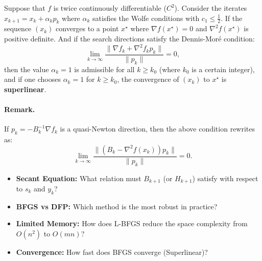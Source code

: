 \begin{theoreme}[Admitted]
    Suppose that $f$ is twice continuously differentiable ($C^2$).
    Consider the iterates $x_{k+1} = x_k + \alpha_k p_k$ where $\alpha_k$ satisfies the Wolfe conditions with $c_1 \le \frac{1}{2}$.
    If the sequence $(x_k)$ converges to a point $x^\star$ where $\nabla f(x^\star) = 0$ and $\nabla^2 f(x^\star)$ is positive definite.
    And if the search directions satisfy the Dennis-Moré condition:
    \begin{equation}
        \lim_{k \to \infty} \frac{\| \nabla f_k + \nabla^2 f_k p_k \|}{\| p_k \|} = 0,
    \end{equation}
    then the value $\alpha_k = 1$ is admissible for all $k \ge k_0$ (where $k_0$ is a certain integer),
    and if one chooses $\alpha_k = 1$ for $k \ge k_0$, the convergence of $(x_k)$ to $x^\star$ is \textbf{superlinear}.
\end{theoreme}

\paragraph{Remark.}
If $p_k = -B_k^{-1} \nabla f_k$ is a quasi-Newton direction, then the above condition rewrites as:
\[
    \lim_{k \to \infty} \frac{\| (B_k - \nabla^2 f(x_k)) p_k \|}{\| p_k \|} = 0.
\]
\bigskip
\begin{checkpoint}
\begin{itemize}
    \item \textbf{Secant Equation:} What relation must $B_{k+1}$ (or $H_{k+1}$) satisfy with respect to $s_k$ and $y_k$?
    \item \textbf{BFGS vs DFP:} Which method is the most robust in practice?
    \item \textbf{Limited Memory:} How does L-BFGS reduce the space complexity from $O(n^2)$ to $O(mn)$?
    \item \textbf{Convergence:} How fast does BFGS converge (Superlinear)?
\end{itemize}
\end{checkpoint}
